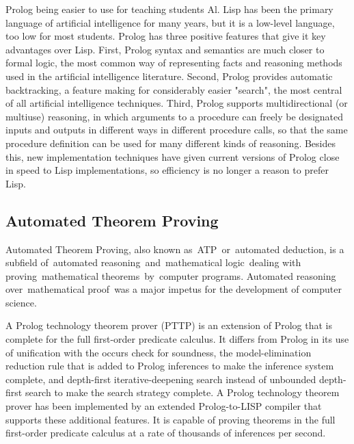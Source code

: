 \documentclass[14pt]{article}
\begin{document}
Prolog being easier to use for teaching students Al. Lisp has been the primary language of artificial intelligence for many years, but it is a low-level language, too low for most students. Prolog has three positive features that give it key advantages over Lisp. First, Prolog syntax and semantics are much closer to formal logic, the most common way of representing facts and reasoning methods used in the artificial intelligence literature. Second, Prolog provides automatic backtracking, a feature making for considerably easier "search", the most central of all artificial intelligence techniques. Third, Prolog supports multidirectional (or multiuse) reasoning, in which arguments to a procedure can freely be designated inputs and outputs in different ways in different procedure calls, so that the same procedure definition can be used for many different kinds of reasoning. Besides this, new implementation techniques have given current versions of Prolog close in speed to Lisp implementations, so efficiency is no longer a reason to prefer Lisp.

\subsection{Automated Theorem Proving}

Automated Theorem Proving, also known as ATP or automated deduction, is a subfield of automated reasoning and mathematical logic dealing with proving mathematical theorems by computer programs. Automated reasoning over mathematical proof was a major impetus for the development of computer science.

A Prolog technology theorem prover (PTTP) is an extension of Prolog that is complete for the full first-order predicate calculus. It differs from Prolog in its use of unification with the occurs check for soundness, the model-elimination reduction rule that is added to Prolog inferences to make the inference system complete, and depth-first iterative-deepening search instead of unbounded depth-first search to make the search strategy complete. A Prolog technology theorem prover has been implemented by an extended Prolog-to-LISP compiler that supports these additional features. It is capable of proving theorems in the full first-order predicate calculus at a rate of thousands of inferences per second.
\end{document}
